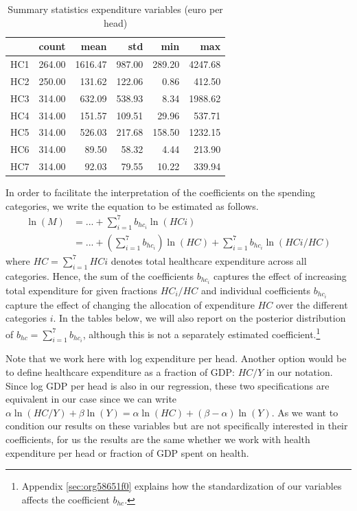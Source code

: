 \documentclass[a4paper,12pt]{article}
\begin{document}
\begin{table}[htbp]
\caption{\label{tab:summary_expenditure_variables}Summary statistics expenditure variables (euro per head)}
\centering
\begin{tabular}{lrrrrr}
 & count & mean & std & min & max\\
\hline
HC1 & 264.00 & 1616.47 & 987.00 & 289.20 & 4247.68\\
HC2 & 250.00 & 131.62 & 122.06 & 0.86 & 412.50\\
HC3 & 314.00 & 632.09 & 538.93 & 8.34 & 1988.62\\
HC4 & 314.00 & 151.57 & 109.51 & 29.96 & 537.71\\
HC5 & 314.00 & 526.03 & 217.68 & 158.50 & 1232.15\\
HC6 & 314.00 & 89.50 & 58.32 & 4.44 & 213.90\\
HC7 & 314.00 & 92.03 & 79.55 & 10.22 & 339.94\\
\end{tabular}
\end{table}

In order to facilitate the interpretation of the coefficients on the spending categories, we write the equation to be estimated as follows.
\begin{align}
\label{eq:17}
\ln(M) &= ... + \sum_{i=1}^7 b_{hc_i} \ln(HCi) \\
\label{eq:18}
 &= ... + \left(\sum_{i=1}^7 b_{hc_i} \right) \ln(HC) +  \sum_{i=1}^7 b_{hc_i} \ln(HCi/HC) 
\end{align}
where \(HC =  \sum_{i=1}^7 HCi\) denotes total healthcare expenditure across all categories. Hence, the sum of the coefficients \(b_{hc_i}\) captures the effect of increasing total expenditure for given fractions \(HC_i/HC\) and individual coefficients \(b_{hc_i}\) capture the effect of changing the allocation of expenditure \(HC\) over the different categories \(i\). In the tables below, we will also report on the posterior distribution of \(b_{hc}= \sum_{i=1}^7 b_{hc_i}\), although this is not a separately estimated coefficient.\footnote{Appendix \ref{sec:org58651f0} explains how the standardization of our variables affects the coefficient \(b_{hc}\).}

Note that we work here with log expenditure per head. Another option would be to define healthcare expenditure as a fraction of GDP: \(HC/Y\) in our notation. Since log GDP per head is also in our regression, these two specifications are equivalent in our case since we can write \(\alpha \ln(HC/Y) + \beta \ln(Y) = \alpha \ln(HC) + (\beta-\alpha) \ln(Y)\). As we want to condition our results on these variables but are not specifically interested in their coefficients, for us the results are the same whether we work with health expenditure per head or fraction of GDP spent on health.
\end{document}
